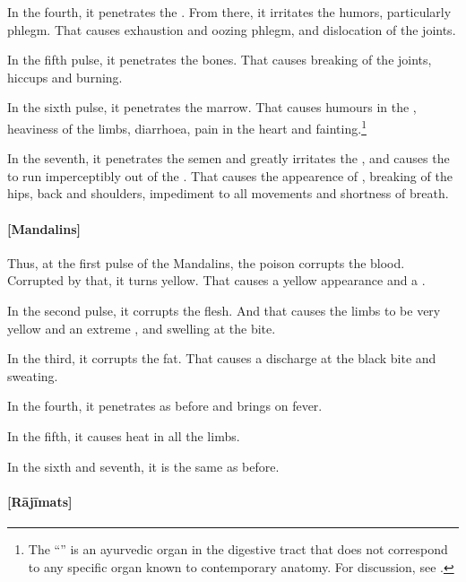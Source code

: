 \begin{translation}

In the fourth, it penetrates the .  From there, it 
irritates the humors, particularly phlegm. That causes exhaustion and oozing 
phlegm, and dislocation of the joints.

In the fifth pulse, it penetrates the bones.  That causes breaking of the joints, 
hiccups 
and burning.

In the sixth pulse, it penetrates the marrow.  That causes humours in the
, heaviness of the limbs, diarrhoea,
pain in the heart and fainting.\footnote{The “” is an ayurvedic organ in the digestive tract that does not
    correspond to any specific organ known to contemporary anatomy.  For
    discussion, see \cites[v.\,1,
    304]{josi-maha}[619]{meul-1974}[544--545]{das-2003}.}
    
In the seventh, it penetrates the semen and greatly irritates the
, and  causes the  to run
imperceptibly out of the .  That causes the appearence
of , breaking of the hips, back and shoulders, impediment 
to all movements and shortness of breath.
    
    
\paragraph{[Mandalins]}    
Thus, at the first pulse of the Mandalins, the poison corrupts the blood.  
Corrupted by that, it turns yellow. That causes a yellow appearance and a 
.

In the second pulse, it corrupts the flesh.  And that causes the limbs to be very 
yellow and an extreme , and swelling at 
the bite.

In the third, it corrupts the fat.  That causes a discharge at the black bite and 
sweating.

In the fourth, it penetrates as before and brings on fever.

In the fifth, it causes heat in all the limbs. 

In the sixth and seventh, it is the same as before. 

\paragraph{[Rājīmats]}


\end{translation}
